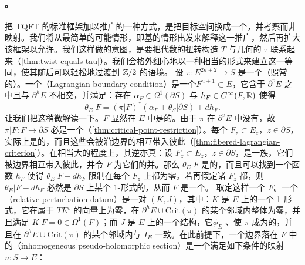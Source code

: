 \paragraph{\trCountingSections。}\label{sub:counting-sections}
把\trFloer{} TQFT 的标准框架加以推广的一种方式，是把目标空间换成一个\trLefschetzFibration，并考察\trPseudoholomorphic\trSection{}而非映射。我们将从最简单的可能情形，即基\trSurface\trCompact{}的情形出发来解释这一推广，然后再扩大该框架以允许\trStriplikeEnd。我们这样做的意图，是要把代数的扭转构造 $T$ 与几何的\trDehnTwist{} $\tau$ 联系起来（\cref{thm:twist-equals-tau}）。我们会格外细心地以一种相当\trCanonical{}的形式来建立这一等同，使其随后可以轻松地过渡到 $\mathbb{Z}/2$-\trEquivariant{}的语境。
设 $\pi\colon E^{2n+2}\to S$ 是一个（照常\trExact{}的）\trLefschetzFibration。一个\emph{\trLagrange\trBoundaryCondition}（Lagrangian boundary condition）是一个\trSubmanifold{}$F^{n+1}\subset E$，它含于 $\partial^vE$ 之中且与 $\partial^hE$ 不相交，并满足：存在 $\alpha_F\in\Omega^1(\partial S)$ 与 $h_F\in C^\infty(F,\mathbb{R})$ 使得
\begin{equation}\label{eq:lagrangian-boundary-condition}
\theta_E|F=(\pi|F)^*(\alpha_F+\theta_S|\partial S)+dh_F.
\end{equation}
让我们把这稍微解读一下。$F$ 显然在 $E$ 中是\trLagrange{}的。由于 $\pi$ 在 $\partial^vE$ 中没有\trCriticalPoint，故 $\pi|F\colon F\to\partial S$ 必是一个\trFiberBundle（\cref{thm:critical-point-restriction}）。每个 $F_z\subset E_z$，$z\in\partial S$，实际上是\trExact{}的\trLagrange\trSubmanifold，而且这些\trSubmanifold{}会被沿边界的\trParallelTransport{}相互带入彼此（\cref{thm:fibered-lagrangian-criterion}）。在相当大的程度上，其逆亦真：设 $F_z\subset E_z$，$z\in\partial S$，是一族\trExact\trLagrange\trSubmanifold，它们被边界\trParallelTransport{}相互带入彼此，并令 $F$ 为它们的并。那么 $\theta_E|F$ 是\trClosed{}的，而且可以找到一个函数 $h_F$ 使得 $\theta_E|F-dh_F$ 限制在每个 $F_z$ 上都为零。若再假定诸 $F_z$ 都\trConnected，则 $\theta_E|F-dh_F$ 必然是 $\partial S$ 上某个 1-形式的\trPullback，从而 $F$ 是一个\trLagrange\trBoundaryCondition。
取定这样一个 $F$。一个\emph{\trRelative\trPerturbationDatum}（relative perturbation datum）是一对 $(K,J)$，其中：$K$ 是 $E$ 上的一个 1-形式，它在属于 $TE^v$ 的向量上为零，在 $\partial^hE\cup\mathrm{Crit}(\pi)$ 的某个邻域内整体为零，并且满足 $K|F=0\in\Omega^1(F)$；而 $J$ 是 $E$ 上的一个\trAlmostComplex{}结构，它$\phi_E$-\trCompatible、使 $\pi$ 成为\trPseudoholomorphic{}的，并且在 $\partial^hE\cup\mathrm{Crit}(\pi)$ 的某个邻域内与 $I_E$ 一致。在此前提下，一个边界落在 $F$ 中的\emph{\trInhomogeneous\trPseudoholomorphic\trSection}（inhomogeneous pseudo-holomorphic section）是一个满足如下条件的映射 $u\colon S\to E$：
